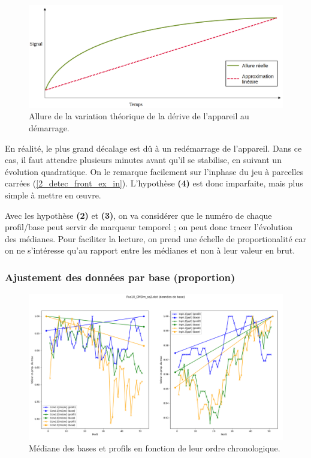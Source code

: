\documentclass[12pt]{article}
\begin{document}
    \begin{figure}[ht!]
        \centering
        \includegraphics[width=\textwidth]{Images/Base_Vrai_Evol.png}  
        \caption{Allure de la variation théorique de la dérive de l'appareil au démarrage.}
    \end{figure}

    En réalité, le plus grand décalage est dû à un redémarrage de l'appareil. Dans ce cas, il faut attendre plusieurs minutes avant qu'il se stabilise, en suivant un évolution quadratique. On le remarque facilement sur l'inphase du jeu à parcelles carrées (\ref{2_detec_front_ex_in}). L'hypothèse \textbf{(4)} est donc imparfaite, mais plus simple à mettre en œuvre.

    Avec les hypothèse \textbf{(2)} et \textbf{(3)}, on va considérer que le numéro de chaque profil/base peut servir de marqueur temporel ; on peut donc tracer l'évolution des médianes. Pour faciliter la lecture, on prend une échelle de proportionalité car on ne s'intéresse qu'au rapport entre les médianes et non à leur valeur en brut.

\subsubsection{Ajustement des données par base (proportion)}

    \begin{figure}[ht!]
        \centering
        \includegraphics[width=\textwidth]{Images/Base_Avant_sq2.png}  
        \caption{Médiane des bases et profils en fonction de leur ordre chronologique.}
    \end{figure}
\end{document}
